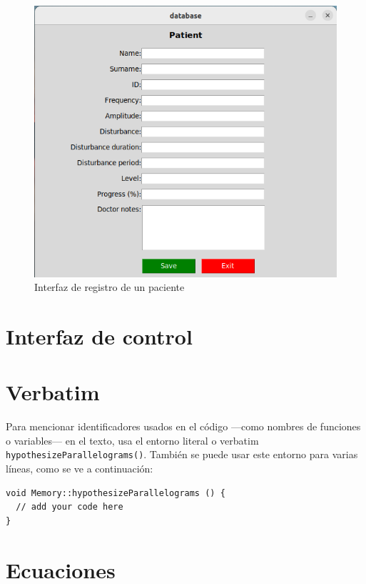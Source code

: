 \begin{figure}[ht!]
	\centering
	\begin{minipage}{0.75\linewidth}
		\centering
		\includegraphics[width=\linewidth]{figs/registro.png}
	\end{minipage}
	\caption[Interfaz de registro de un paciente]{Interfaz de registro de un paciente}
	\label{fig:database}
\end{figure}

\section{Interfaz de control}



\section{Verbatim}

Para mencionar identificadores usados en el código ---como nombres de funciones o variables--- en el texto, usa el entorno literal o verbatim \verb|hypothesizeParallelograms()|. También se puede usar este entorno para varias líneas, como se ve a continuación:

\begin{verbatim}
void Memory::hypothesizeParallelograms () {
  // add your code here
}
\end{verbatim}

\section{Ecuaciones}

